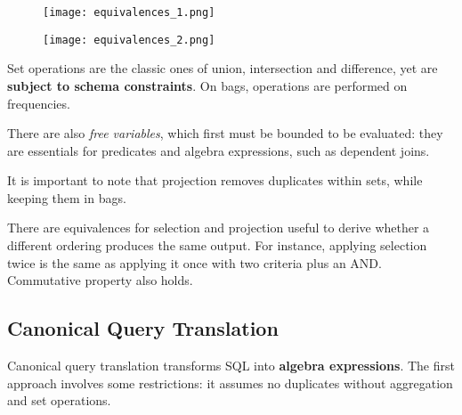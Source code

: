 \begin{figure}
	\begin{minipage}{0.45\textwidth}
		\hspace{-2mm}
		\texttt{[image: equivalences\_1.png]}
	\end{minipage}
	\begin{minipage}{0.5\textwidth}
		\hspace{-10mm}
		\texttt{[image: equivalences\_2.png]}
	\end{minipage}
	\vspace{-15pt}
\end{figure}

Set operations are the classic ones of union, intersection and difference, yet are \textbf{subject to schema constraints}. On bags, operations are performed on frequencies. 

There are also \textit{free variables}, which first must be bounded to be evaluated: they are essentials for predicates and algebra expressions, such as dependent joins. 

It is important to note that projection removes duplicates within sets, while keeping them in bags.

There are equivalences for selection and projection useful to derive whether a different ordering produces the same output. For instance, applying selection twice is the same as applying it once with two criteria plus an AND. Commutative property also holds.

\subsection{Canonical Query Translation}
Canonical query translation transforms SQL into \textbf{algebra expressions}. The first approach involves some restrictions: it assumes no duplicates without aggregation and set operations.

